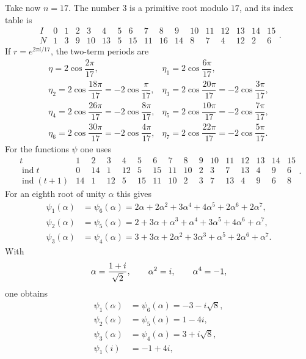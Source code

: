 \documentclass[11pt]{article}
\providecommand{\ind}{\operatorname{ind}}
\begin{document}
Take now $n=17$. The number $3$ is a primitive root modulo $17$, and its index table is
\[
\begin{array}{c|rrrrrrrrrrrrrrrr}
I&0&1&2&3&4&5&6&7&8&9&10&11&12&13&14&15\\ \hline
N&1&3&9&10&13&5&15&11&16&14&8&7&4&12&2&6
\end{array}.                                                            \tag{14}
\]
If $r=e^{2\pi i/17}$, the two-term periods are
\[
\begin{array}{ll}
\eta=2\cos\dfrac{2\pi}{17},
&\eta_1=2\cos\dfrac{6\pi}{17},\\[0.5em]
\eta_2=2\cos\dfrac{18\pi}{17}=-2\cos\dfrac{\pi}{17},
&\eta_3=2\cos\dfrac{20\pi}{17}=-2\cos\dfrac{3\pi}{17},\\[0.5em]
\eta_4=2\cos\dfrac{26\pi}{17}=-2\cos\dfrac{8\pi}{17},
&\eta_5=2\cos\dfrac{10\pi}{17}=-2\cos\dfrac{7\pi}{17},\\[0.5em]
\eta_6=2\cos\dfrac{30\pi}{17}=-2\cos\dfrac{4\pi}{17},
&\eta_7=2\cos\dfrac{22\pi}{17}=-2\cos\dfrac{5\pi}{17}.
\end{array}                                                            \tag{15}
\]
For the functions $\psi$ one uses
\[
\begin{array}{c|rrrrrrrrrrrrrrr}
t&1&2&3&4&5&6&7&8&9&10&11&12&13&14&15\\ \hline
\ind t&0&14&1&12&5&15&11&10&2&3&7&13&4&9&6\\
\ind(t+1)&14&1&12&5&15&11&10&2&3&7&13&4&9&6&8
\end{array}.                                                           \tag{16}
\]
For an eighth root of unity $\alpha$ this gives
\[
\begin{aligned}
\psi_1(\alpha)&=\psi_6(\alpha)=2\alpha+2\alpha^2+3\alpha^4+4\alpha^5+2\alpha^6+2\alpha^7,\\
\psi_2(\alpha)&=\psi_5(\alpha)=2+3\alpha+
\alpha^3+
\alpha^4+3\alpha^5+4\alpha^6+
\alpha^7,\\
\psi_3(\alpha)&=\psi_4(\alpha)=3+3\alpha+2\alpha^2+3\alpha^3+
\alpha^5+2\alpha^6+
\alpha^7.
\end{aligned}                                                          \tag{17}
\]
With
\[
        \alpha={1+i\over \sqrt2},
        \qquad \alpha^2=i,
        \qquad \alpha^4=-1,
\]
one obtains
\[
\begin{aligned}
\psi_1(\alpha)&=\psi_6(\alpha)=-3-i\sqrt8,\\
\psi_2(\alpha)&=\psi_5(\alpha)=1-4i,\\
\psi_3(\alpha)&=\psi_4(\alpha)=3+i\sqrt8,\\
\psi_1(i)&=-1+4i,
\end{aligned}                                                          \tag{18}
\]
\end{document}
